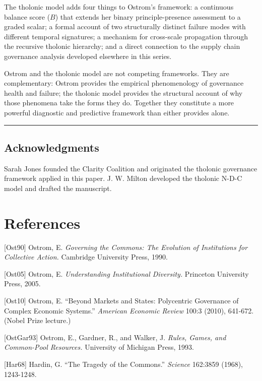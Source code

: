 \documentclass[12pt]{article}
\begin{document}
The tholonic model adds four things to Ostrom's framework: a continuous
balance score (\(B\)) that extends her binary principle-presence
assessment to a graded scalar; a formal account of two structurally
distinct failure modes with different temporal signatures; a mechanism
for cross-scale propagation through the recursive tholonic hierarchy;
and a direct connection to the supply chain governance analysis
developed elsewhere in this series.

Ostrom and the tholonic model are not competing frameworks. They are
complementary: Ostrom provides the empirical phenomenology of governance
health and failure; the tholonic model provides the structural account
of why those phenomena take the forms they do. Together they constitute
a more powerful diagnostic and predictive framework than either provides
alone.

\begin{center}\rule{0.5\linewidth}{0.5pt}\end{center}

\subsection{Acknowledgments}\label{acknowledgments}

Sarah Jones founded the Clarity Coalition and originated the tholonic
governance framework applied in this paper. J. W. Milton developed the
tholonic N-D-C model and drafted the manuscript.

\section{References}\label{references}

{[}Ost90{]} Ostrom, E. \emph{Governing the Commons: The Evolution of
Institutions for Collective Action.} Cambridge University Press, 1990.

{[}Ost05{]} Ostrom, E. \emph{Understanding Institutional Diversity.}
Princeton University Press, 2005.

{[}Ost10{]} Ostrom, E. ``Beyond Markets and States: Polycentric
Governance of Complex Economic Systems.'' \emph{American Economic
Review} 100:3 (2010), 641-672. (Nobel Prize lecture.)

{[}OstGar93{]} Ostrom, E., Gardner, R., and Walker, J. \emph{Rules,
Games, and Common-Pool Resources.} University of Michigan Press, 1993.

{[}Har68{]} Hardin, G. ``The Tragedy of the Commons.'' \emph{Science}
162:3859 (1968), 1243-1248.
\end{document}
